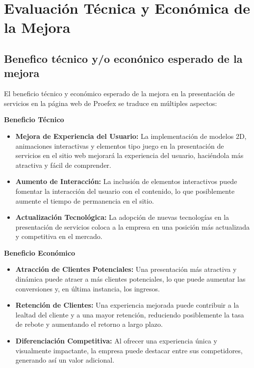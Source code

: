 \titlespacing{\chapter}{0pt}{120pt}{7pt}
\chapter{Evaluación Técnica y Económica de la Mejora}
\label{cap:evaluación}

\section{Benefico técnico y/o econónico esperado de la mejora}

El beneficio técnico y económico esperado de la mejora en la presentación de servicios en la página web de Proefex se traduce en múltiples aspectos:

\textbf{Beneficio Técnico}

\begin{itemize}
\item \textbf{Mejora de Experiencia del Usuario:} La implementación de modelos 2D,
	animaciones interactivas y elementos tipo juego en la presentación de servicios
	en el sitio web mejorará la experiencia del usuario, haciéndola más atractiva y
	fácil de comprender.
\item \textbf{Aumento de Interacción:} La inclusión de elementos interactivos puede fomentar
la interacción del usuario con el contenido, lo que posiblemente aumente el tiempo
de permanencia en el sitio.
\item \textbf{Actualización Tecnológica:} La adopción de nuevas tecnologías en la presentación
de servicios coloca a la empresa en una posición más actualizada y competitiva en el
mercado.
\end{itemize}

\textbf{Beneficio Económico}

\begin{itemize}
\item \textbf{Atracción de Clientes Potenciales:} Una presentación más atractiva y dinámica
puede atraer a más clientes potenciales, lo que puede aumentar las conversiones y,
	  en última instancia, los ingresos.
\item \textbf{Retención de Clientes:} Una experiencia mejorada puede contribuir a la lealtad del
cliente y a una mayor retención, reduciendo posiblemente la tasa de rebote y aumentando
el retorno a largo plazo.
\item \textbf{Diferenciación Competitiva:} Al ofrecer una experiencia única y visualmente
impactante, la empresa puede destacar entre sus competidores, generando así un valor
adicional.
\end{itemize}

